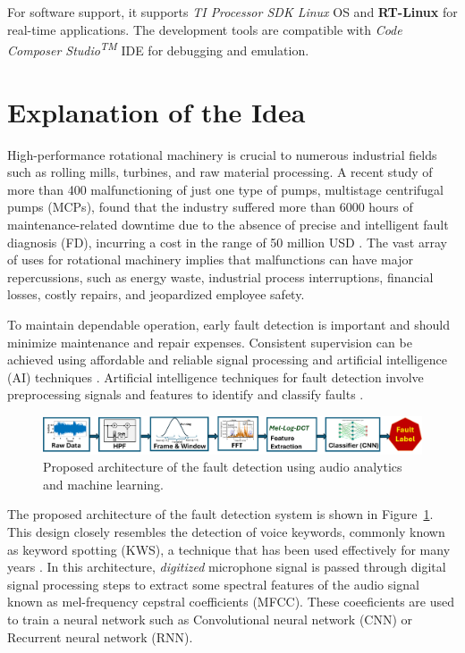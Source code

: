 \documentclass[12pt,twoside]{article}
\begin{document}
For software support, it supports \textit{TI Processor SDK Linux} OS and \textbf{RT-Linux} for real-time applications. The development tools are compatible with \textit{Code Composer Studio\textsuperscript{TM}} IDE for debugging and emulation.

\section{Explanation of the Idea}

High-performance rotational machinery is crucial to numerous industrial fields such as rolling mills, turbines, and raw material processing.
A recent study of more than 400 malfunctioning of just one type of pumps, multistage centrifugal pumps (MCPs), found that the industry suffered more than 6000 hours of maintenance-related downtime due to the absence of precise and intelligent fault diagnosis (FD), incurring a cost in the range of 50 million USD \cite{rane2021re}.
The vast array of uses for rotational machinery implies that malfunctions can have major repercussions, such as energy waste, industrial process interruptions, financial losses, costly repairs, and jeopardized employee safety. 

To maintain dependable operation, early fault detection is important and should minimize maintenance and repair expenses. Consistent supervision can be achieved using affordable and reliable signal processing and artificial intelligence (AI) techniques \cite{sunal2022review}. Artificial intelligence techniques for fault detection involve preprocessing signals and features to identify and classify faults \cite{saeed2021fault, jiang2019bearing}.

\begin{figure}[htb]
\centering
\includegraphics[width=1.0\linewidth]{figs/fig-arch1.png}
\caption{\label{fig:arch1}Proposed architecture of the fault detection using audio analytics and machine learning.}
\end{figure}

The proposed architecture of the fault detection system is shown in Figure~\ref{fig:arch1}. This design closely resembles the detection of voice keywords, commonly known as keyword spotting (KWS), a technique that has been used effectively for many years \cite{chong20220}.
In this architecture, \textit{digitized} microphone signal is passed through digital signal processing steps to extract some spectral features of the audio signal known as mel-frequency cepstral coefficients (MFCC). These coeeficients are used to train a neural network such as Convolutional neural network (CNN) or Recurrent neural network (RNN). 
\end{document}

